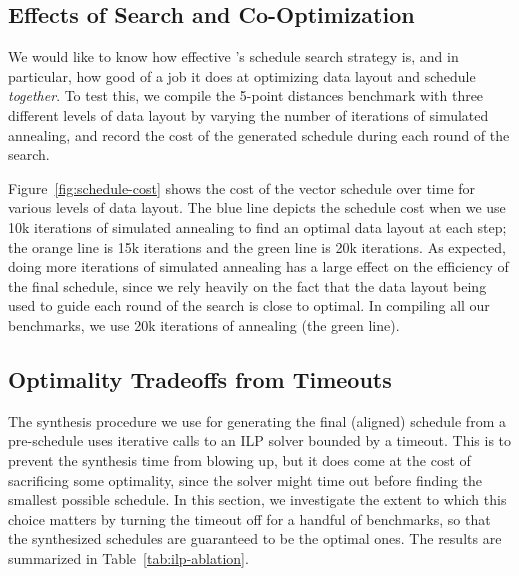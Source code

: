 \subsection{Effects of Search and Co-Optimization}\label{sec:search-and-cooptimization}
We would like to know how effective \system's schedule search strategy is, and in particular, how good of a job it does at optimizing data layout and schedule {\em together}.
To test this, we compile the 5-point distances benchmark with three different levels of data layout by varying the number of iterations of simulated annealing, and record the cost of the generated schedule during each round of the search.

Figure~\ref{fig:schedule-cost} shows the cost of the vector schedule over time for various levels of data layout.
The blue line depicts the schedule cost when we use 10k iterations of simulated annealing to find an optimal data layout at each step; the orange line is 15k iterations and the green line is 20k iterations.
As expected, doing more iterations of simulated annealing has a large effect on the efficiency of the final schedule, since we rely heavily on the fact that the data layout being used to guide each round of the search is close to optimal.
In compiling all our benchmarks, we use 20k iterations of annealing (the green line).

\subsection{Optimality Tradeoffs from Timeouts}\label{sec:ilp-ablation}
The synthesis procedure we use for generating the final (aligned) schedule from a pre-schedule uses iterative calls to an ILP solver bounded by a timeout.
This is to prevent the synthesis time from blowing up, but it does come at the cost of sacrificing some optimality, since the solver might time out before finding the smallest possible schedule. 
In this section, we investigate the extent to which this choice matters by turning the timeout off for a handful of benchmarks, so that the synthesized schedules are guaranteed to be the optimal ones. 
The results are summarized in Table~\ref{tab:ilp-ablation}.

